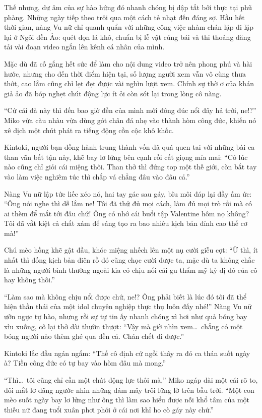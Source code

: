 \documentclass[../main.tex]{subfiles}
\begin{document}
Thế nhưng, dư âm của sự hào hứng đó nhanh chóng bị dập tắt bởi thực tại phũ phàng. Những ngày tiếp theo trôi qua một cách tẻ nhạt đến đáng sợ. Hầu hết thời gian, nàng Vu nữ chỉ quanh quẩn với những công việc nhàm chán lặp đi lặp lại ở Ngôi đền Ảo: quét dọn lá khô, chuẩn bị lễ vật cúng bái và thi thoảng đăng tải vài đoạn video ngắn lên kênh cá nhân của mình.

Mặc dù đã cố gắng hết sức để làm cho nội dung video trở nên phong phú và hài hước, nhưng cho đến thời điểm hiện tại, số lượng người xem vẫn vô cùng thưa thớt, cao lắm cũng chỉ lẹt đẹt được vài nghìn lượt xem. Chính sự thờ ơ của khán giả ảo đã bóp nghẹt chút động lực ít ỏi còn sót lại trong lòng cô nàng.

``Cứ cái đà này thì đến bao giờ đền của mình mới đông đúc nổi đây hả trời, ne!?'' Miko vừa càu nhàu vừa dùng gót chân đá nhẹ vào thành hòm công đức, khiến nó xê dịch một chút phát ra tiếng động cồn cộc khô khốc.

Kintoki, người bạn đồng hành trung thành vốn đã quá quen tai với những bài ca than vãn bất tận này, khẽ bay lơ lửng bên cạnh rồi cất giọng mỉa mai: ``Cô lúc nào cũng chỉ giỏi cái miệng thôi. Than thở thì đứng top một thế giới, còn bắt tay vào làm việc nghiêm túc thì chắp vá chẳng đâu vào đâu cả.''

Nàng Vu nữ lập tức liếc xéo nó, hai tay gác sau gáy, bĩu môi đáp lại đầy ấm ức: ``Ông nói nghe thì dễ lắm ne! Tôi đã thử đủ mọi cách, làm đủ mọi trò rồi mà có ai thèm để mắt tới đâu chứ! Ông có nhớ cái buổi tập Valentine hôm nọ không? Tôi đã vắt kiệt cả chất xám để sáng tạo ra bao nhiêu kịch bản đỉnh cao thế cơ mà!''

Chú mèo hồng khẽ gật đầu, khóe miệng nhếch lên một nụ cười giễu cợt: ``Ừ thì, ít nhất thì đống kịch bản điên rồ đó cũng chọc cười được ta, mặc dù ta không chắc là những người bình thường ngoài kia có chịu nổi cái gu thẩm mỹ kỳ dị đó của cô hay không thôi.''

``Làm sao mà không chịu nổi được chứ, ne!? Ông phải biết là lúc đó tôi đã thể hiện thần thái của một idol chuyên nghiệp thực thụ luôn đấy nhé!'' Nàng Vu nữ ưỡn ngực tự hào, nhưng rồi sự tự tin ấy nhanh chóng xì hơi như quả bóng bay xìu xuống, cô lại thở dài thườn thượt: ``Vậy mà giờ nhìn xem\dots\ chẳng có một bóng người nào thèm ghé qua đền cả. Chán chết đi được.''

Kintoki lắc đầu ngán ngẩm: ``Thế cô định cứ ngồi thây ra đó ca thán suốt ngày à? Tiền công đức có tự bay vào hòm đâu mà mong.''

``Thì\dots\ tôi cũng chỉ cần một chút động lực thôi mà,'' Miko ngáp dài một cái rõ to, đôi mắt lơ đãng ngước nhìn những đám mây trôi lững lờ trên bầu trời. ``Một con mèo suốt ngày bay lơ lửng như ông thì làm sao hiểu được nỗi khổ tâm của một thiếu nữ đang tuổi xuân phơi phới ở cái nơi khỉ ho cò gáy này chứ.''
\end{document}
